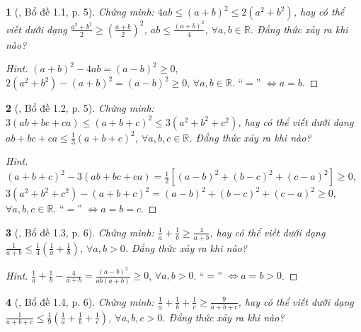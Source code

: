 \documentclass{article}
\newtheorem{baitoan}{}
\begin{document}
\begin{baitoan}[\cite{Son_Nghiep_Trung_Can_bdt}, Bổ đề 1.1, p. 5]
	Chứng minh: $4ab\le(a + b)^2\le2(a^2 + b^2)$, hay có thể viết dưới dạng $\frac{a^2 + b^2}{2}\ge\left(\frac{a + b}{2}\right)^2$, $ab\le\frac{(a + b)^2}{4}$, $\forall a,b\in\mathbb{R}$. Đẳng thức xảy ra khi nào?
\end{baitoan}

\begin{proof}[Hint]
	$(a + b)^2 - 4ab = (a - b)^2\ge 0$, $2(a^2 + b^2) - (a + b)^2 = (a - b)^2\ge 0$, $\forall a,b\in\mathbb{R}$. ``$=$'' $\Leftrightarrow a = b$.
\end{proof}

\begin{baitoan}[\cite{Son_Nghiep_Trung_Can_bdt}, Bổ đề 1.2, p. 5]
	Chứng minh: $3(ab + bc + ca)\le(a + b + c)^2\le3(a^2 + b^2 + c^2)$, hay có thể viết dưới dạng $ab + bc + ca\le\frac{1}{3}(a + b + c)^2$, $\forall a,b,c\in\mathbb{R}$. Đẳng thức xảy ra khi nào?
\end{baitoan}

\begin{proof}[Hint]
	$(a + b + c)^2 - 3(ab + bc + ca) = \frac{1}{2}\left[(a - b)^2 + (b - c)^2 + (c - a)^2\right]\ge 0$, $3(a^2 + b^2 + c^2) - (a + b + c)^2 = (a - b)^2 + (b - c)^2 + (c - a)^2\ge 0$, $\forall a,b,c\in\mathbb{R}$. ``$=$'' $\Leftrightarrow a = b = c$.
\end{proof}

\begin{baitoan}[\cite{Son_Nghiep_Trung_Can_bdt}, Bổ đề 1.3, p. 6]
	Chứng minh: $\frac{1}{a} + \frac{1}{b}\ge\frac{4}{a + b}$, hay có thể viết dưới dạng $\frac{1}{a + b}\le\frac{1}{4}\left(\frac{1}{a} + \frac{1}{b}\right)$, $\forall a,b > 0$. Đẳng thức xảy ra khi nào?
\end{baitoan}

\begin{proof}[Hint]
	$\frac{1}{a} + \frac{1}{b} - \frac{4}{a + b} = \frac{(a - b)^2}{ab(a + b)}\ge 0$, $\forall a,b > 0$. ``$=$'' $\Leftrightarrow a = b > 0$.
\end{proof}

\begin{baitoan}[\cite{Son_Nghiep_Trung_Can_bdt}, Bổ đề 1.4, p. 6]
	Chứng minh: $\frac{1}{a} + \frac{1}{b} + \frac{1}{c}\ge\frac{9}{a + b + c}$, hay có thể viết dưới dạng $\frac{1}{a + b + c}\le\frac{1}{9}\left(\frac{1}{a} + \frac{1}{b} + \frac{1}{c}\right)$, $\forall a,b,c > 0$. Đẳng thức xảy ra khi nào?
\end{baitoan}
\end{document}
